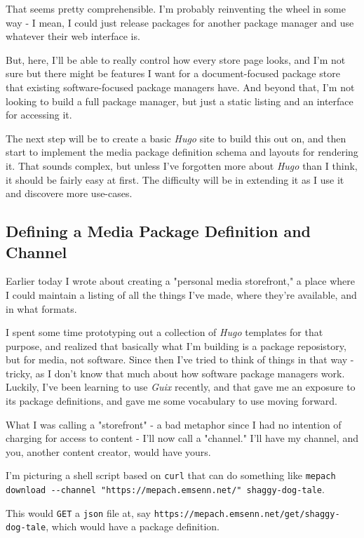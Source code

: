 \documentclass[11pt]{article}
\begin{document}
That seems pretty comprehensible. I'm probably reinventing the wheel
in some way - I mean, I could just release packages for another
package manager and use whatever their web interface is.

But, here, I'll be able to really control how every store page looks,
and I'm not sure but there might be features I want for a
document-focused package store that existing software-focused package
managers have. And beyond that, I'm not looking to build a full
package manager, but just a static listing and an interface for
accessing it.

The next step will be to create a basic \emph{Hugo} site to build this out
on, and then start to implement the media package definition schema
and layouts for rendering it. That sounds complex, but unless I've
forgotten more about \emph{Hugo} than I think, it should be fairly easy at
first. The difficulty will be in extending it as I use it and
discovere more use-cases.

\subsection*{Defining a Media Package Definition and Channel}
\label{sec:org9efbeb8}
Earlier today I wrote about creating a "personal media storefront," a
place where I could maintain a listing of all the things I've made,
where they're available, and in what formats.

I spent some time prototyping out a collection of \emph{Hugo} templates
for that purpose, and realized that basically what I'm building is a
package reposistory, but for media, not software. Since then I've
tried to think of things in that way - tricky, as I don't know that
much about how software package managers work. Luckily, I've been
learning to use \emph{Guix} recently, and that gave me an exposure to its
package definitions, and gave me some vocabulary to use moving
forward.

What I was calling a "storefront" - a bad metaphor since I had no
intention of charging for access to content - I'll now call a
"channel." I'll have my channel, and you, another content creator,
would have yours.

I'm picturing a shell script based on \texttt{curl} that can do something
like \texttt{mepach download -{}-channel "https://mepach.emsenn.net/"
shaggy-dog-tale}.

This would \texttt{GET} a \texttt{json} file at, say
\texttt{https://mepach.emsenn.net/get/shaggy-dog-tale}, which would have a
package definition.
\end{document}
